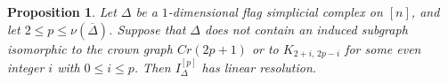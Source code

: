 \documentclass[12pt]{amsart}
\newcommand{\cT}{\mathcal{T}}
\let\epsilon\varepsilon
\newtheorem{Proposition}[Theorem]{Proposition}
\begin{document}








\begin{Proposition}\label{Prop: other implciation}
Let $\Delta$ be a $1$-dimensional flag simplicial complex on $[n]$, and let
$2 \leq p \leq \nu(\overline{\Delta})$. Suppose that $\Delta$ does not contain an induced subgraph isomorphic to the crown graph $Cr(2p+1)$ or to $K_{2+i,\,2p-i}$ for some even integer $i$ with $0 \leq i \leq p$.  Then $I_{\Delta}^{[p]}$ has linear resolution. 
\end{Proposition}
\end{document}
